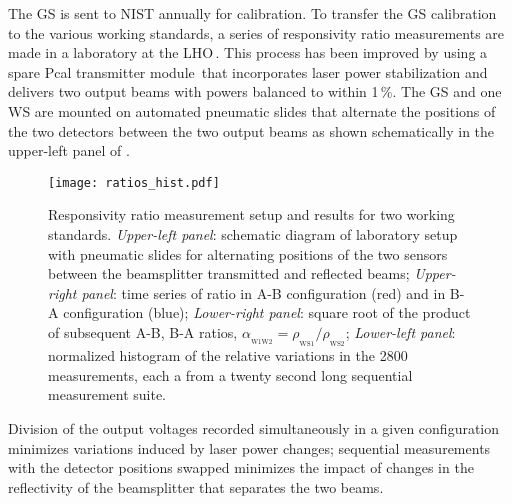 \documentclass[12pt,a4paper,final]{iopart}
\begin{document}
The GS is sent to NIST annually for calibration. %
To transfer the GS calibration to the various working standards, a series of responsivity ratio measurements are made in a laboratory at the LHO\,\cite{in_lab_index}.  This process has been improved by using a spare Pcal transmitter module\,\cite{RSIpaper} that incorporates laser power stabilization and delivers two output beams with powers balanced to within 1\,\%.  The GS and one WS are mounted on automated pneumatic slides that alternate the positions of the two detectors between the two output beams as shown schematically in the upper-left panel of .
%
\begin{figure}[t]%
    \begin{center}
    \texttt{[image: ratios\_hist.pdf]}
    \caption{ Responsivity ratio measurement setup and results for two working standards. {\em Upper-left panel}: schematic diagram of laboratory setup with pneumatic slides for alternating positions of the two sensors between the beamsplitter transmitted and reflected beams; {\em Upper-right panel}: time series of ratio in A-B configuration (red) and in B-A configuration (blue); {\em Lower-right panel}: square root of the product of subsequent A-B, B-A ratios, $\alpha_{_{\textrm{W1W2}}}=\rho_{_{\mathrm{WS1}}}/\rho_{_{\textrm{WS2}}}$; {\em Lower-left panel}: normalized histogram of the relative variations in the 2800 measurements, each a from a twenty second long sequential measurement suite.}
    \label{fig:ratios_hist}
    \end{center}
\end{figure}
%
Division of the output voltages recorded simultaneously in a given configuration minimizes variations induced by laser power changes; sequential measurements with the detector positions swapped minimizes the impact of changes in the reflectivity of the beamsplitter that separates the two beams.
\end{document}

